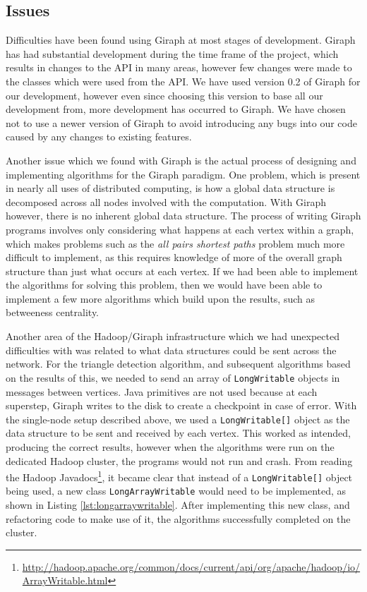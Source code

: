 \subsection{Issues}
Difficulties have been found using Giraph at most stages of development. Giraph has had substantial development during the time frame of the project, which results in changes to the API in many areas, however few changes were made to the classes which were used from the API. We have used version 0.2 of Giraph for our development, however even since choosing this version to base all our development from, more development has occurred to Giraph. We have chosen not to use a newer version of Giraph to avoid introducing any bugs into our code caused by any changes to existing features.

Another issue which we found with Giraph is the actual process of designing and implementing algorithms for the Giraph paradigm. One problem, which is present in nearly all uses of distributed computing, is how a global data structure is decomposed across all nodes involved with the computation. With Giraph however, there is no inherent global data structure. The process of writing Giraph programs involves only considering what happens at each vertex within a graph, which makes problems such as the \emph{all pairs shortest paths} problem much more difficult to implement, as this requires knowledge of more of the overall graph structure than just what occurs at each vertex. If we had been able to implement the algorithms for solving this problem, then we would have been able to implement a few more algorithms which build upon the results, such as betweeness centrality.

Another area of the Hadoop/Giraph infrastructure which we had unexpected difficulties with was related to what data structures could be sent across the network. For the triangle detection algorithm, and subsequent algorithms based on the results of this, we needed to send an array of \verb/LongWritable/ objects in messages between vertices. Java primitives are not used because at each superstep, Giraph writes to the disk to create a checkpoint in case of error. With the single-node setup described above, we used a \verb/LongWritable[]/ object as the data structure to be sent and received by each vertex. This worked as intended, producing the correct results, however when the algorithms were run on the dedicated Hadoop cluster, the programs would not run and crash. From reading the Hadoop Javadocs\footnote{\url{http://hadoop.apache.org/common/docs/current/api/org/apache/hadoop/io/ArrayWritable.html}}, it became clear that instead of a \verb/LongWritable[]/ object being used, a new class \verb/LongArrayWritable/ would need to be implemented, as shown in Listing \ref{lst:longarraywritable}. After implementing this new class, and refactoring code to make use of it, the algorithms successfully completed on the cluster.

